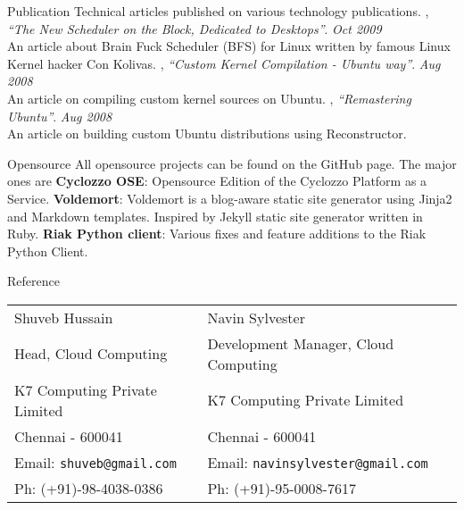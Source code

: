 \documentclass{resume}
\begin{document}
\newpage


\begin{category}{Publication}
  \citemnobullet Technical articles published on various technology publications.
  , {\em ``The New Scheduler on the Block, Dedicated to Desktops''}. \hfill {\em Oct 2009}\\
  An article about Brain Fuck Scheduler (BFS) for Linux written by famous Linux Kernel hacker Con Kolivas.
  , {\em ``Custom Kernel Compilation - Ubuntu way''}. \hfill {\em Aug 2008}\\
  An article on compiling custom kernel sources on Ubuntu.
  , {\em ``Remastering Ubuntu''}. \hfill {\em Aug 2008}\\
  An article on building custom Ubuntu distributions using Reconstructor.
\end{category}


\begin{category}{Opensource}
  \citemnobullet All opensource projects can be found on the GitHub page. The major ones are
  \citembullet \textbf{Cyclozzo OSE}: Opensource Edition of the Cyclozzo Platform as a Service.
  \citembullet \textbf{Voldemort}: Voldemort is a blog-aware static site generator using Jinja2 
  and Markdown templates. Inspired by Jekyll static site generator written in Ruby.
  \citembullet \textbf{Riak Python client}: Various fixes and feature additions to the Riak Python Client.
\end{category}


\begin{category}{Reference}
  \citemnobullet \\
  \begin{tabular}{ll}Shuveb Hussain&Navin Sylvester\\
    Head, Cloud Computing&Development Manager, Cloud Computing\\
    K7 Computing Private Limited&K7 Computing Private Limited\\
    Chennai - 600041&Chennai - 600041\\
    Email: \mbox{\small\tt shuveb@gmail.com}&Email: \mbox{\small\tt navinsylvester@gmail.com}\\
    Ph: (+91)-98-4038-0386&Ph: (+91)-95-0008-7617
  \end{tabular}
\end{category}
\end{document}
